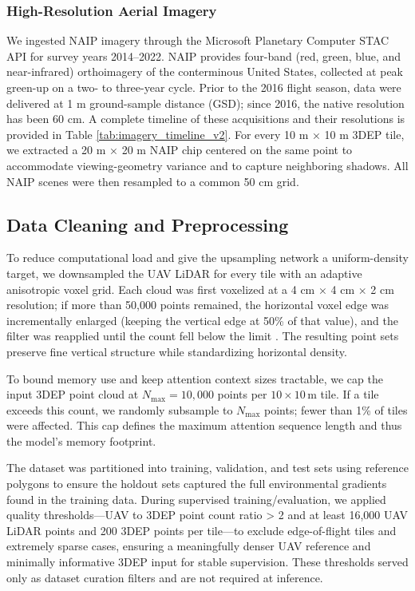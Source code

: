 \documentclass[remotesensing,article,accept,pdftex,moreauthors]{Definitions/mdpi}
\begin{document}
\subsubsection{High-Resolution Aerial Imagery}
We ingested NAIP imagery through the Microsoft Planetary Computer STAC API \citep{planetary_computer} for survey years 2014–2022. NAIP provides four-band (red, green, blue, and near-infrared) orthoimagery of the conterminous United States, collected at peak green-up on a two- to three-year cycle. Prior to the 2016 flight season, data were delivered at 1 m ground-sample distance (GSD); since 2016, the native resolution has been 60 cm. A complete timeline of these acquisitions and their resolutions is provided in Table \ref{tab:imagery_timeline_v2}. For every 10 m × 10 m 3DEP tile, we extracted a 20 m × 20 m NAIP chip centered on the same point to accommodate viewing-geometry variance and to capture neighboring shadows. All NAIP scenes were then resampled to a common 50 cm grid.



\subsection{Data Cleaning and Preprocessing}
To reduce computational load and give the upsampling network a uniform-density target, we downsampled the UAV LiDAR for every tile with an adaptive anisotropic voxel grid. Each cloud was first voxelized at a 4 cm × 4 cm × 2 cm resolution; if more than 50,000 points remained, the horizontal voxel edge was incrementally enlarged (keeping the vertical edge at 50\% of that value), and the filter was reapplied until the count fell below the limit%
. The resulting point sets preserve fine vertical structure while standardizing horizontal density.

To bound memory use and keep attention context sizes tractable, we cap the input 3DEP point cloud at $N_{\max}=10{,}000$ points per $10\times10$\,m tile. If a tile exceeds this count, we randomly subsample to $N_{\max}$ points; fewer than 1\% of tiles were affected. This cap defines the maximum attention sequence length and thus the model's memory footprint.

The dataset was partitioned into training, validation, and test sets using reference polygons to ensure the holdout sets captured the full environmental gradients found in the training data. During supervised training/evaluation, we applied quality thresholds—UAV to 3DEP point count ratio > 2 and at least 16,000 UAV LiDAR points and 200 3DEP points per tile—to exclude edge-of-flight tiles and extremely sparse cases, ensuring a meaningfully denser UAV reference and minimally informative 3DEP input for stable supervision. These thresholds served only as dataset curation filters and are not required at inference.
\end{document}
